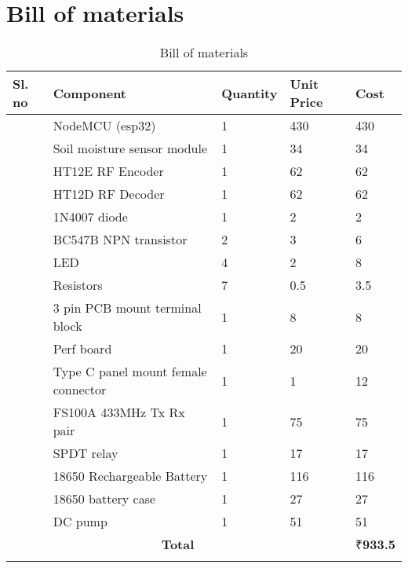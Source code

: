 \newpage
\chapter{Bill of materials}
\renewcommand{\arraystretch}{1.5}

\newcommand\rnum{\stepcounter{tocostnum}\arabic{tocostnum}}

\begin{longtable}[h!]{|l|l|l|l|l|} \hline
\textbf{Sl. no} & \textbf{Component}            & \textbf{Quantity} & \textbf{Unit Price} & \textbf{Cost} \\ \hline
	\rnum  & NodeMCU (esp32)                    & 1        & 430        & 430  \\ \hline
	\rnum  & Soil moisture sensor module        & 1        &  34        & 34   \\ \hline
	\rnum  & HT12E RF Encoder                   & 1        &  62        & 62   \\ \hline
	\rnum  & HT12D RF Decoder                   & 1        &  62        & 62   \\ \hline
	\rnum  & 1N4007 diode                       & 1        &   2        & 2    \\ \hline
	\rnum  & BC547B NPN transistor              & 2        &   3        & 6    \\ \hline
	\rnum  & LED                                & 4        &   2        & 8    \\ \hline
	\rnum  & Resistors                          & 7        &   0.5      & 3.5  \\ \hline
	\rnum  & 3 pin PCB mount terminal block     & 1        &   8        & 8    \\ \hline
	\rnum  & Perf board                         & 1        &  20        & 20   \\ \hline
	\rnum  & Type C panel mount female connector& 1        &   1        & 12   \\ \hline
	\rnum  & FS100A 433MHz Tx Rx pair           & 1        &  75        & 75   \\ \hline
	\rnum  & SPDT relay                         & 1        &  17        & 17   \\ \hline
	\rnum  & 18650 Rechargeable Battery         & 1        & 116        & 116  \\ \hline
	\rnum  & 18650 battery case                 & 1        &  27        & 27   \\ \hline
	\rnum  & DC pump                            & 1        &  51        & 51   \\ \hline
	\multicolumn{4}{|c|}{\textbf{Total}}& ₹\textbf{933.5} \\ \hline
	\caption{Bill of materials}
\end{longtable}

